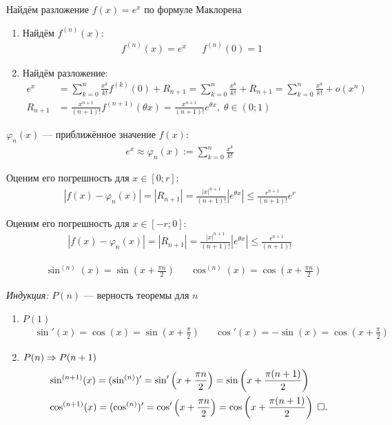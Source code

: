 \documentclass{article}
\begin{document}


Найдём разложение $f(x)=e^{x}$ по формуле Маклорена

\begin{enumerate}
	\item{}Найдём $f^{(n)}(x)$:
	\begin{align*}
		 & f^{(n)}(x)=e^{x} &  & f^{(n)}(0)=1
	\end{align*}
	\item{}Найдём разложение:
	\begin{align*}
		e^{x}   & =\sum_{k=0}^{n}\frac{x^{k}}{k!}f^{(k)}(0)+R_{n+1}=\sum_{k=0}^{n}\frac{x^{k}}{k!}+R_{n+1}=\sum_{k=0}^{n}\frac{x^{k}}{k!}+o(x^{n}) \\
		R_{n+1} & =\frac{x^{n+1}}{(n+1)!}f^{(n+1)}(\theta x)=\frac{x^{n+1}}{(n+1)!}e^{\theta x},\;\theta\in(0;1)
	\end{align*}
\end{enumerate}

$\varphi_{n}(x)$ --- приближённое значение $f(x)$:
\begin{align*}
	e^{x}\approx\varphi_{n}(x):=\sum_{k=0}^{n}\frac{x^{k}}{k!}
\end{align*}

Оценим его погрешность для $x\in[0;r]$:
\begin{align*}
	|f(x)-\varphi_{n}(x)|=|R_{n+1}|=\frac{|x|^{n+1}}{(n+1)!}|e^{\theta x}|\leq\frac{r^{n+1}}{(n+1)!}e^{r}
\end{align*}

Оценим его погрешность для $x\in[-r;0]$:
\begin{align*}
	|f(x)-\varphi_{n}(x)|=|R_{n+1}|=\frac{|x|^{n+1}}{(n+1)!}|e^{\theta x}|\leq\frac{r^{n+1}}{(n+1)!}
\end{align*}

\theorem
\begin{align*}
	 & \sin^{(n)}(x)=\sin\left(x+\frac{\pi n}{2}\right) &  & \cos^{(n)}(x)=\cos\left(x+\frac{\pi n}{2}\right)
\end{align*}

\proof

{\it Индукция:} $P(n)$ --- верность теоремы для $n$
\begin{enumerate}
	\item{}$P(1)$
	\begin{align*}
		 & \sin'(x)=\cos(x)=\sin\left(x+\frac{\pi}{2}\right) &  & \cos'(x)=-\sin(x)=\cos\left(x+\frac{\pi}{2}\right)
	\end{align*}
	\item{}$P(n)\Rarr P(n+1)$
	\begin{align*}
		 & \sin^{(n+1)}(x)=(\sin^{(n)})'=\sin'\left(x+\frac{\pi n}{2}\right)=\sin\left(x+\frac{\pi(n+1)}{2}\right)     \\
		 & \cos^{(n+1)}(x)=(\cos^{(n)})'=\cos'\left(x+\frac{\pi n}{2}\right)=\cos\left(x+\frac{\pi(n+1)}{2}\right)\qed
	\end{align*}
\end{enumerate}
\end{document}
